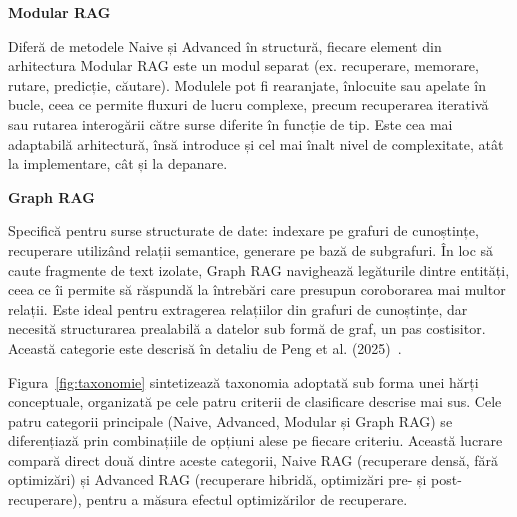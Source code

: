 \textbf{Modular RAG}

Diferă de metodele Naive și Advanced în structură, fiecare element din arhitectura Modular RAG este un modul separat (ex. recuperare, memorare, rutare, predicție, căutare). Modulele pot fi rearanjate, înlocuite sau apelate în bucle, ceea ce permite fluxuri de lucru complexe, precum recuperarea iterativă sau rutarea interogării către surse diferite în funcție de tip. Este cea mai adaptabilă arhitectură, însă introduce și cel mai înalt nivel de complexitate, atât la implementare, cât și la depanare.

\textbf{Graph RAG}

Specifică pentru surse structurate de date: indexare pe grafuri de cunoștințe, recuperare utilizând relații semantice, generare pe bază de subgrafuri. În loc să caute fragmente de text izolate, Graph RAG navighează legăturile dintre entități, ceea ce îi permite să răspundă la întrebări care presupun coroborarea mai multor relații. Este ideal pentru extragerea relațiilor din grafuri de cunoștințe, dar necesită structurarea prealabilă a datelor sub formă de graf, un pas costisitor. Această categorie este descrisă în detaliu de Peng et al. (2025)~\cite{peng2025graph}.

Figura~\ref{fig:taxonomie} sintetizează taxonomia adoptată sub forma unei hărți conceptuale, organizată pe cele patru criterii de clasificare descrise mai sus. Cele patru categorii principale (Naive, Advanced, Modular și Graph RAG) se diferențiază prin combinațiile de opțiuni alese pe fiecare criteriu. Această lucrare compară direct două dintre aceste categorii, Naive RAG (recuperare densă, fără optimizări) și Advanced RAG (recuperare hibridă, optimizări pre- și post-recuperare), pentru a măsura efectul optimizărilor de recuperare.

